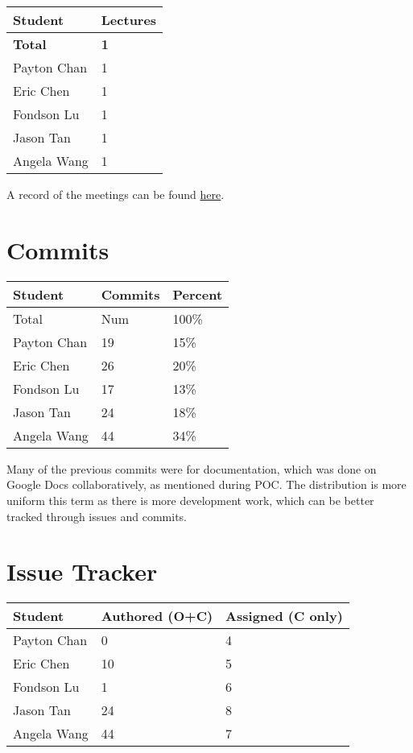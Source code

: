 \documentclass{article}
\begin{document}
\begin{table}[H]
    \centering
    \begin{tabular}{ll}
    \toprule
    \textbf{Student} & \textbf{Lectures}\\
    \midrule
    \textbf{Total} & \textbf{1}\\
    Payton Chan & 1\\
    Eric Chen & 1\\
    Fondson Lu & 1\\
    Jason Tan & 1\\
    Angela Wang & 1\\
    \bottomrule
    \end{tabular}
\end{table}

A record of the meetings can be found
\href{https://github.com/PlutosCapstone/Plutos/issues?q=label%3Ameeting+is%3Aclosed}{here}.
    

\section{Commits}


\begin{table}[H]
\centering
\begin{tabular}{lll}
\toprule
\textbf{Student} & \textbf{Commits} & \textbf{Percent}\\
\midrule
Total & Num & 100\% \\
Payton Chan & 19 & 15\%\\
Eric Chen & 26 & 20\%\\
Fondson Lu & 17 & 13\%\\
Jason Tan & 24 & 18\%\\
Angela Wang & 44 & 34\%\\

\bottomrule
\end{tabular}
\end{table}

Many of the previous commits were for documentation, which was done on Google
Docs collaboratively, as mentioned during POC. The distribution is more uniform
this term as there is more development work, which can be better tracked through
issues and commits.

\section{Issue Tracker}

\begin{table}[H]
\centering
\begin{tabular}{lll}
\toprule
\textbf{Student} & \textbf{Authored (O+C)} & \textbf{Assigned (C only)}\\
\midrule
Payton Chan & 0 & 4\\
Eric Chen & 10 & 5\\
Fondson Lu & 1 & 6\\
Jason Tan & 24 & 8\\
Angela Wang & 44 & 7\\
\bottomrule
\end{tabular}
\end{table}
\end{document}
